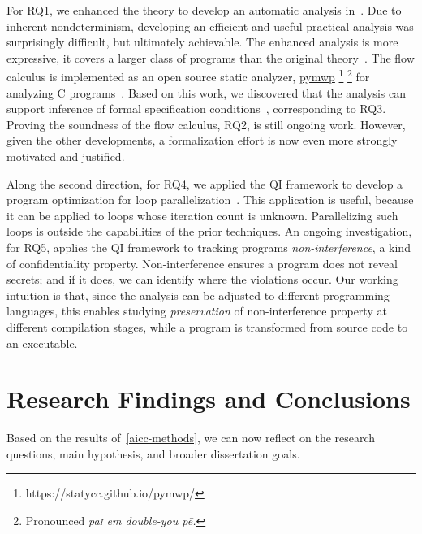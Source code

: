 For RQ1, we enhanced the theory to develop an automatic analysis in~\cite{aubert20222,aubert2023b,rusch2025}.
Due to inherent nondeterminism, developing an efficient and useful practical analysis was surprisingly difficult, but ultimately achievable.
The enhanced analysis is more expressive,
\ie it covers a larger class of programs than the original theory~\cite{rusch2025}.
The flow calculus is implemented as an open source static analyzer,
\href{https://statycc.github.io/pymwp/}{pymwp}%
\footnote{https://statycc.github.io/pymwp/}%
\footnote{Pronounced \emph{pa\textsc{i} em double-you p\={e}.}} for analyzing C programs~\cite{pymwp}.
Based on this work, we discovered that the analysis can support
inference of formal specification conditions~\cite{rusch2025}, corresponding to RQ3.
Proving the soundness of the flow calculus, RQ2, is still ongoing work.
However, given the other developments, a formalization effort is now even more strongly motivated and justified.

Along the second direction, for RQ4, we applied the QI framework to develop a program optimization for loop parallelization~\cite{aubert20232}.
This application is useful, because it can be applied to loops whose iteration count is unknown.
Parallelizing such loops is outside the capabilities of the prior techniques.
An ongoing investigation, for RQ5, applies the QI framework to tracking programs \emph{non-interference}, a kind of confidentiality property.
Non-interference ensures a program does not reveal secrets;
and if it does, we can identify where the violations occur.
Our working intuition is that, since the analysis can be adjusted to different programming languages,
this enables studying \emph{preservation} of non-interference property at different compilation stages,
while a program is transformed from source code to an executable.

\section{Research Findings and Conclusions}
\label{aicc-discussion}

Based on the results of~\autoref{aicc-methods}, we can now reflect on the
research questions, main hypothesis, and broader dissertation goals.

